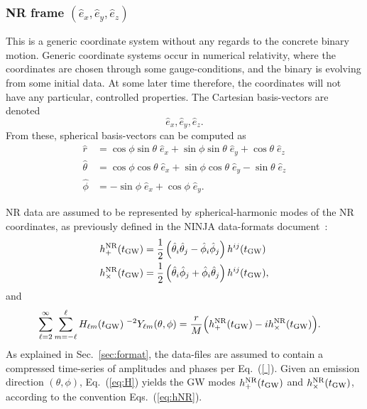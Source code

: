 \documentclass[11pt,tightenlines,article,amssymb,amsmath,amsfonts,superscriptaddress,nofootinbib]{revtex4}
\newcommand{\ExNR}{\hat e_x}
\newcommand{\EyNR}{\hat e_y}
\newcommand{\EzNR}{\hat e_z}
\newcommand{\tNR}{\theta}
\newcommand{\pNR}{\phi}
\newcommand{\ErNR}{{\hat r}}
\newcommand{\EtNR}{{\hat\theta}}
\newcommand{\EpNR}{{\hat\phi}}
\newcommand{\hpNR}{h_+^{\rm NR}}
\newcommand{\hcNR}{h_{\times}^{\rm NR}}
\newcommand{\tGW}{t_{\rm GW}}
\begin{document}
\subsubsection{NR frame \boldmath$(  \ExNR, \EyNR, \EzNR)$}

This is a generic coordinate system without any regards to the
concrete binary motion. Generic coordinate systems occur in numerical
relativity, where the coordinates are chosen through some
gauge-conditions, and the binary is evolving from some initial data.
At some later time therefore, the coordinates will not have any
particular, controlled properties.
The Cartesian basis-vectors are denoted
\begin{equation}
  \ExNR, \EyNR, \EzNR.
\end{equation}
From these, spherical basis-vectors can be computed as
\begin{subequations}
  \label{eq:NRspherical}
\begin{align}
  \ErNR & = \cos\pNR\sin\tNR\;\ExNR + \sin\pNR\sin\tNR\;\EyNR +\cos\tNR\;\EzNR\\
  \EtNR & = \cos\pNR\cos\tNR\;\ExNR + \sin\pNR\cos\tNR\;\EyNR -\sin\tNR\;\EzNR\\
  \EpNR & =        -\sin\pNR\;\ExNR +         \cos\pNR\;\EyNR.
\end{align}
\end{subequations}

NR data are assumed to be represented by spherical-harmonic modes of the
NR coordinates, as previously defined in the NINJA data-formats
document~\cite{Brown:2007jx}:
\begin{subequations}\label{eq:hNR}
\begin{align}
  \hpNR(\tGW) & = \frac{1}{2}\left(\EtNR_i\EtNR_j-\EpNR_i\EpNR_j\right)h^{ij}(\tGW)\\
  \hcNR(\tGW) & = \frac{1}{2}\left(\EtNR_i\EpNR_j+\EpNR_i\EtNR_j\right)h^{ij}(\tGW),
\end{align}
\end{subequations}
and
\begin{align}\label{eq:H}
  \sum_{\ell=2}^\infty\sum_{m=-\ell}^\ell H_{\ell m}&(\tGW)\;^{-2}Y_{\ell m}(\tNR,\pNR)
  = \frac{r}{M}\Big(\hpNR(\tGW)-i\hcNR(\tGW)\Big). %
\end{align}
As explained in Sec.~\ref{sec:format}, the data-files are assumed to
contain a compressed time-series of amplitudes and phases per
Eq.~(\ref{ }).  Given an emission direction $(\tNR,\pNR)$,
Eq.~(\ref{eq:H}) yields the GW modes $\hpNR(\tGW)$ and $\hcNR(\tGW)$,
according to the convention Eqs.~(\ref{eq:hNR}).
\end{document}
